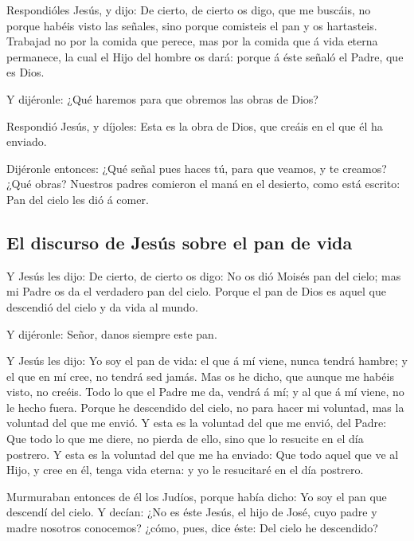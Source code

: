  Respondióles Jesús, y dijo: De cierto, de cierto os
digo, que me buscáis, no porque habéis visto las señales, sino porque
comisteis el pan y os hartasteis.  Trabajad no por la
comida que perece, mas por la comida que á vida eterna permanece, la
cual el Hijo del hombre os dará: porque á éste señaló el Padre, que es
Dios.

 Y dijéronle: ¿Qué haremos para que obremos las obras de
Dios?

 Respondió Jesús, y díjoles: Esta es la obra de Dios, que
creáis en el que él ha enviado.

 Dijéronle entonces: ¿Qué señal pues haces tú, para que
veamos, y te creamos? ¿Qué obras?  Nuestros padres
comieron el maná en el desierto, como está escrito: Pan del cielo les
dió á comer.

\hypertarget{el-discurso-de-jesuxfas-sobre-el-pan-de-vida}{%
\subsection{El discurso de Jesús sobre el pan de
vida}\label{el-discurso-de-jesuxfas-sobre-el-pan-de-vida}}

 Y Jesús les dijo: De cierto, de cierto os digo: No os
dió Moisés pan del cielo; mas mi Padre os da el verdadero pan del cielo.
 Porque el pan de Dios es aquel que descendió del cielo y
da vida al mundo.

 Y dijéronle: Señor, danos siempre este pan.

 Y Jesús les dijo: Yo soy el pan de vida: el que á mí
viene, nunca tendrá hambre; y el que en mí cree, no tendrá sed jamás.
 Mas os he dicho, que aunque me habéis visto, no creéis.
 Todo lo que el Padre me da, vendrá á mí; y al que á mí
viene, no le hecho fuera.  Porque he descendido del
cielo, no para hacer mi voluntad, mas la voluntad del que me envió.
 Y esta es la voluntad del que me envió, del Padre: Que
todo lo que me diere, no pierda de ello, sino que lo resucite en el día
postrero.  Y esta es la voluntad del que me ha enviado:
Que todo aquel que ve al Hijo, y cree en él, tenga vida eterna: y yo le
resucitaré en el día postrero.

 Murmuraban entonces de él los Judíos, porque había
dicho: Yo soy el pan que descendí del cielo.  Y decían:
¿No es éste Jesús, el hijo de José, cuyo padre y madre nosotros
conocemos? ¿cómo, pues, dice éste: Del cielo he descendido?

